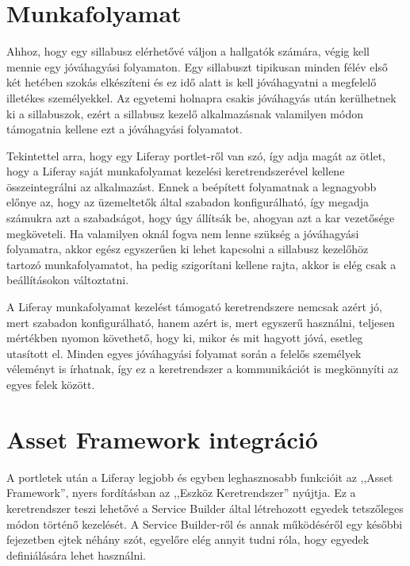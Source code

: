 \documentclass[hidelinks, 12pt, a4paper]{report}
\begin{document}
\section{Munkafolyamat}

Ahhoz, hogy egy sillabusz elérhetővé váljon a hallgatók számára, végig kell mennie egy jóváhagyási folyamaton. Egy sillabuszt tipikusan minden félév első két hetében szokás elkészíteni és ez idő alatt is kell jóváhagyatni a megfelelő illetékes személyekkel. Az egyetemi holnapra csakis jóváhagyás után kerülhetnek ki a sillabuszok, ezért a sillabusz kezelő alkalmazásnak valamilyen módon támogatnia kellene ezt a jóváhagyási folyamatot.

Tekintettel arra, hogy egy Liferay portlet-ről van szó, így adja magát az ötlet, hogy a Liferay saját munkafolyamat kezelési keretrendszerével kellene összeintegrálni az alkalmazást. Ennek a beépített folyamatnak a legnagyobb előnye az, hogy az üzemeltetők által szabadon konfigurálható, így megadja számukra azt a szabadságot, hogy úgy állítsák be, ahogyan azt a kar vezetősége megköveteli. Ha valamilyen oknál fogva nem lenne szükség a jóváhagyási folyamatra, akkor egész egyszerűen ki lehet kapcsolni a sillabusz kezelőhöz tartozó munkafolyamatot, ha pedig szigorítani kellene rajta, akkor is elég csak a beállításokon változtatni.

A Liferay munkafolyamat kezelést támogató keretrendszere nemcsak azért jó, mert szabadon konfigurálható, hanem azért is, mert egyszerű használni, teljesen mértékben nyomon követhető, hogy ki, mikor és mit hagyott jóvá, esetleg utasított el. Minden egyes jóváhagyási folyamat során a felelős személyek véleményt is írhatnak, így ez a keretrendszer a kommunikációt is megkönnyíti az egyes felek között.

\section{Asset Framework integráció}

A portletek után a Liferay legjobb és egyben leghasznosabb funkcióit az ,,Asset Framework'', nyers fordításban az ,,Eszköz Keretrendszer'' nyújtja. Ez a keretrendszer teszi lehetővé a Service Builder által létrehozott egyedek tetszőleges módon történő kezelését. A Service Builder-ről és annak működéséről egy későbbi fejezetben ejtek néhány szót, egyelőre elég annyit tudni róla, hogy egyedek definiálására lehet használni.
\end{document}
